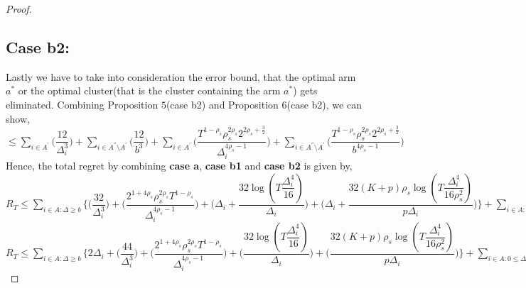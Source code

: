 \begin{proof}
\subsection{Case b2:} 
Lastly we have to take into consideration the error bound, that the optimal arm $a^{*}$ or the optimal cluster(that is the cluster containing the arm $a^{*}$) gets eliminated. Combining Proposition $5$(case b2) and Proposition $6$(case b2), we can show,
\newline
$\leq\sum_{i\in A^{'}}\bigg(\dfrac{12}{\Delta_{i}^{3}} \bigg)+\sum_{i\in A^{''}\setminus A^{'}}\bigg(\dfrac{12}{b^{3}} \bigg) + \sum_{i\in A^{'}}\bigg(\dfrac{T^{1-\rho_{s}}\rho_{s}^{2\rho_{s}}2^{2\rho_{s}+\frac{3}{2}}}{\Delta_{i}^{4\rho_{s}-1}} \bigg)+\sum_{i\in A^{''}\setminus A^{'}}\bigg(\dfrac{T^{1-\rho_{s}}\rho_{s}^{2\rho_{s}}2^{2\rho_{s}+\frac{3}{2}}}{b^{4\rho_{s} -1}} \bigg)$
\newline
Hence, the total regret by combining \textbf{case a}, \textbf{case b1} and \textbf{case b2} is given by,
\newline
$R_{T}\leq \sum_{i\in A:\Delta\geq b} \bigg\lbrace \bigg(\dfrac{32}{\Delta_{i}^{3}}\bigg) + \bigg(\dfrac{2^{1+4\rho_{s}}\rho_{s}^{2\rho_{s}}T^{1-\rho_{s}}}{\Delta_{i}^{4\rho_{s}-1}}\bigg) + \bigg(\Delta_{i}+\dfrac{32\log{(T\dfrac{\Delta_{i}^{4}}{16})}}{\Delta_{i}}\bigg) + \bigg(\Delta_{i}+\dfrac{32(K+p)\rho_{s}\log{(T\dfrac{\Delta_{i}^{4}}{16\rho_{s}^{2}})}}{p\Delta_{i}}\bigg)\bigg\rbrace + \sum_{i\in A:0\leq\Delta_{i}\leq b}\bigg\lbrace \bigg(\dfrac{12}{\Delta_{i}^{3}} \bigg) + \bigg(\dfrac{12}{b^{3}} \bigg) + \bigg(\dfrac{T^{1-\rho_{s}}\rho_{s}^{2\rho_{s}}2^{2\rho_{s}+\frac{3}{2}}}{\Delta_{i}^{4\rho_{s}-1}} \bigg)+\bigg(\dfrac{T^{1-\rho_{s}}\rho_{s}^{2\rho_{s}}2^{2\rho_{s}+\frac{3}{2}}}{b^{4\rho_{s} -1}} \bigg) \bigg\rbrace + max_{i:\Delta\leq b}\Delta_{i}T $
\newline
$R_{T}\leq \sum_{i\in A:\Delta\geq b} \bigg\lbrace 2\Delta_{i}+ \bigg(\dfrac{44}{\Delta_{i}^{3}}\bigg) + \bigg(\dfrac{2^{1+4\rho_{s}}\rho_{s}^{2\rho_{s}}T^{1-\rho_{s}}}{\Delta_{i}^{4\rho_{s}-1}}\bigg) + \bigg(\dfrac{32\log{(T\dfrac{\Delta_{i}^{4}}{16})}}{\Delta_{i}}\bigg) + \bigg(\dfrac{32(K+p)\rho_{s}\log{(T\dfrac{\Delta_{i}^{4}}{16\rho_{s}^{2}})}}{p\Delta_{i}}\bigg)\bigg\rbrace + \sum_{i\in A:0\leq\Delta_{i}\leq b}\bigg\lbrace \bigg(\dfrac{12}{b^{3}} \bigg) + \bigg(\dfrac{T^{1-\rho_{s}}\rho_{s}^{2\rho_{s}}2^{2\rho_{s}+\frac{3}{2}}}{\Delta_{i}^{4\rho_{s}-1}} \bigg)+\bigg(\dfrac{T^{1-\rho_{s}}\rho_{s}^{2\rho_{s}}2^{2\rho_{s}+\frac{3}{2}}}{b^{4\rho_{s} -1}} \bigg) \bigg\rbrace + max_{i:\Delta\leq b}\Delta_{i}T $

\end{proof}
